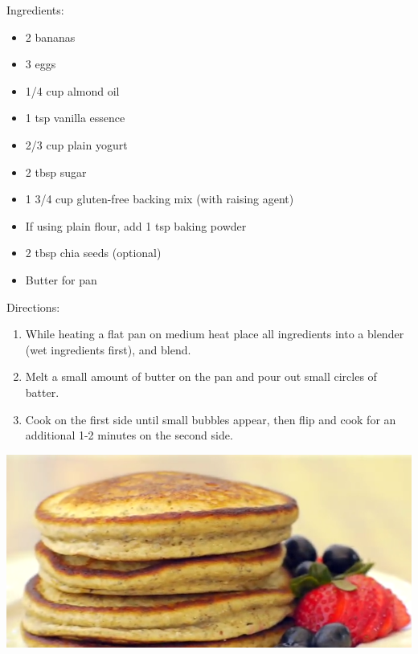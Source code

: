 \documentclass{article}
\begin{document}
%
%
%
%
%

\begin{multicols}{2}
Ingredients:
\begin{itemize}
\item 2 bananas
\item 3 eggs
\item 1/4 cup almond oil
\item 1 tsp vanilla essence
\item 2/3 cup plain yogurt
\item 2 tbsp sugar
\item 1 3/4 cup gluten-free backing mix (with raising agent)
\item If using plain flour, add 1 tsp baking powder
\item 2 tbsp chia seeds (optional)
\item Butter for pan
\end{itemize}

\columnbreak

Directions:
\begin{enumerate}
\item While heating a flat pan on medium heat place all ingredients into a blender (wet ingredients first), and blend.

\item Melt a small amount of butter on the pan and pour out small circles of batter.

\item Cook on the first side until small bubbles appear, then flip and cook for an additional 1-2 minutes on the second side.
\end{enumerate}
\end{multicols}



\begin{center}
\includegraphics[scale=0.4]{Pancakes.png}
\end{center}
\end{document}
